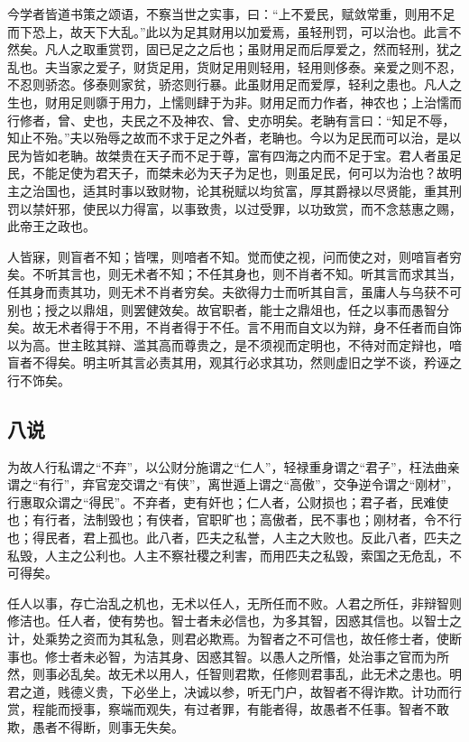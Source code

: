 \documentclass[]{article}
\begin{document}
今学者皆道书策之颂语，不察当世之实事，曰：``上不爱民，赋敛常重，则用不足而下恐上，故天下大乱。''此以为足其财用以加爱焉，虽轻刑罚，可以治也。此言不然矣。凡人之取重赏罚，固已足之之后也；虽财用足而后厚爱之，然而轻刑，犹之乱也。夫当家之爱子，财货足用，货财足用则轻用，轻用则侈泰。亲爱之则不忍，不忍则骄恣。侈泰则家贫，骄恣则行暴。此虽财用足而爱厚，轻利之患也。凡人之生也，财用足则隳于用力，上懦则肆于为非。财用足而力作者，神农也；上治懦而行修者，曾、史也，夫民之不及神农、曾、史亦明矣。老聃有言曰：``知足不辱，知止不殆。''夫以殆辱之故而不求于足之外者，老聃也。今以为足民而可以治，是以民为皆如老聃。故桀贵在天子而不足于尊，富有四海之内而不足于宝。君人者虽足民，不能足使为君天子，而桀未必为天子为足也，则虽足民，何可以为治也？故明主之治国也，适其时事以致财物，论其税赋以均贫富，厚其爵禄以尽贤能，重其刑罚以禁奸邪，使民以力得富，以事致贵，以过受罪，以功致赏，而不念慈惠之赐，此帝王之政也。

人皆寐，则盲者不知；皆嘿，则喑者不知。觉而使之视，问而使之对，则喑盲者穷矣。不听其言也，则无术者不知；不任其身也，则不肖者不知。听其言而求其当，任其身而责其功，则无术不肖者穷矣。夫欲得力士而听其自言，虽庸人与乌获不可别也；授之以鼎俎，则罢健效矣。故官职者，能士之鼎俎也，任之以事而愚智分矣。故无术者得于不用，不肖者得于不任。言不用而自文以为辩，身不任者而自饰以为高。世主眩其辩、滥其高而尊贵之，是不须视而定明也，不待对而定辩也，喑盲者不得矣。明主听其言必责其用，观其行必求其功，然则虚旧之学不谈，矜诬之行不饰矣。

\hypertarget{header-n1590}{%
\subsection{八说}\label{header-n1590}}

为故人行私谓之``不弃''，以公财分施谓之``仁人''，轻禄重身谓之``君子''，枉法曲亲谓之``有行''，弃官宠交谓之``有侠''，离世遁上谓之``高傲''，交争逆令谓之``刚材''，行惠取众谓之``得民''。不弃者，吏有奸也；仁人者，公财损也；君子者，民难使也；有行者，法制毁也；有侠者，官职旷也；高傲者，民不事也；刚材者，令不行也；得民者，君上孤也。此八者，匹夫之私誉，人主之大败也。反此八者，匹夫之私毁，人主之公利也。人主不察社稷之利害，而用匹夫之私毁，索国之无危乱，不可得矣。

任人以事，存亡治乱之机也，无术以任人，无所任而不败。人君之所任，非辩智则修洁也。任人者，使有势也。智士者未必信也，为多其智，因惑其信也。以智士之计，处乘势之资而为其私急，则君必欺焉。为智者之不可信也，故任修士者，使断事也。修士者未必智，为洁其身、因惑其智。以愚人之所惽，处治事之官而为所然，则事必乱矣。故无术以用人，任智则君欺，任修则君事乱，此无术之患也。明君之道，贱德义贵，下必坐上，决诚以参，听无门户，故智者不得诈欺。计功而行赏，程能而授事，察端而观失，有过者罪，有能者得，故愚者不任事。智者不敢欺，愚者不得断，则事无失矣。
\end{document}
